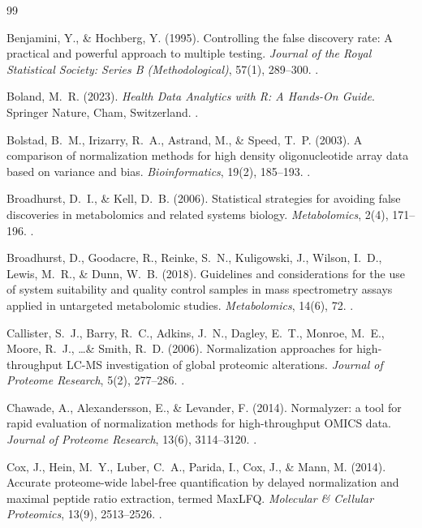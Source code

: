 \documentclass[11pt,oneside]{book}
\begin{document}
\begin{thebibliography}{99}

Benjamini, Y., \& Hochberg, Y. (1995). Controlling the false discovery rate: A practical and powerful approach to multiple testing. \textit{Journal of the Royal Statistical Society: Series B (Methodological)}, 57(1), 289--300. .

Boland, M.~R. (2023). \textit{Health Data Analytics with R: A Hands-On Guide}. Springer Nature, Cham, Switzerland. .

Bolstad, B.~M., Irizarry, R.~A., Astrand, M., \& Speed, T.~P. (2003). A comparison of normalization methods for high density oligonucleotide array data based on variance and bias. \textit{Bioinformatics}, 19(2), 185--193. .

Broadhurst, D.~I., \& Kell, D.~B. (2006). Statistical strategies for avoiding false discoveries in metabolomics and related systems biology. \textit{Metabolomics}, 2(4), 171--196. .

Broadhurst, D., Goodacre, R., Reinke, S.~N., Kuligowski, J., Wilson, I.~D., Lewis, M.~R., \& Dunn, W.~B. (2018). Guidelines and considerations for the use of system suitability and quality control samples in mass spectrometry assays applied in untargeted metabolomic studies. \textit{Metabolomics}, 14(6), 72. .

Callister, S.~J., Barry, R.~C., Adkins, J.~N., Dagley, E.~T., Monroe, M.~E., Moore, R.~J., \dots \& Smith, R.~D. (2006). Normalization approaches for high-throughput LC-MS investigation of global proteomic alterations. \textit{Journal of Proteome Research}, 5(2), 277--286. .

Chawade, A., Alexandersson, E., \& Levander, F. (2014). Normalyzer: a tool for rapid evaluation of normalization methods for high-throughput OMICS data. \textit{Journal of Proteome Research}, 13(6), 3114--3120. .

Cox, J., Hein, M.~Y., Luber, C.~A., Parida, I., Cox, J., \& Mann, M. (2014). Accurate proteome-wide label-free quantification by delayed normalization and maximal peptide ratio extraction, termed MaxLFQ. \textit{Molecular \& Cellular Proteomics}, 13(9), 2513--2526. .


\end{thebibliography}
\end{document}
